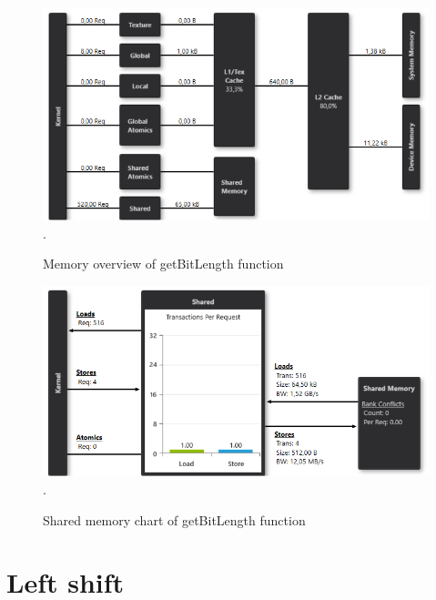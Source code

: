 \documentclass[oneside,openright,12pt,final,en]{mgr}
\begin{document}
\begin{figure}[H]
	\centering
	\includegraphics[width=\textwidth]{bitlength_memory}.
	\caption{Memory overview of getBitLength function}
	\label{fig:bitlength_memory}
\end{figure}

\begin{figure}[H]
	\centering
	\includegraphics[width=\textwidth]{bitlength_shared}.
	\caption{Shared memory chart of getBitLength function}
	\label{fig:bitlength_shared}
\end{figure}

\section{Left shift}
\end{document}
